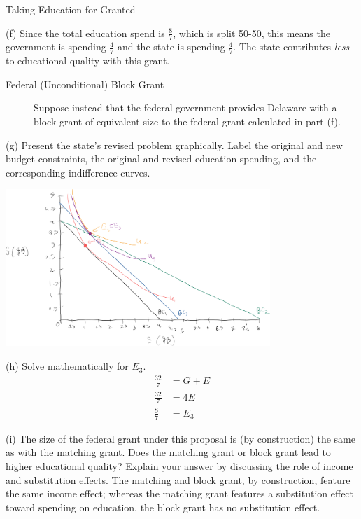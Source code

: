 \documentclass[8pt]{extarticle}
\begin{document}
\begin{problem}{Taking Education for Granted}
\begin{problem}{(f)}
      \tcblower
      Since the total education spend is $\frac{8}{7}$, which is split 50-50, this means the government is spending $\frac{4}{7}$ and the state is spending $\frac{4}{7}$. The state contributes \textit{less} to educational quality with this grant.
    \end{problem}
    \begin{description}
      \item[Federal (Unconditional) Block Grant] Suppose instead that the federal government provides Delaware with a block grant of equivalent size to the federal grant calculated in part (f).
    \end{description}
    \begin{problem}{(g)}
      Present the state's revised problem graphically. Label the original and new budget constraints, the original and revised education spending, and the corresponding indifference curves.
      \tcblower
      \begin{center}
        \includegraphics[width=0.75\textwidth]{images/3_4_g.png}
      \end{center}
    \end{problem}
    \begin{problem}{(h)}
      Solve mathematically for $E_3$.
      \tcblower
      \begin{align*}
        \frac{32}{7} &= G + E \\
      \frac{32}{7} &= 4E\\
      \frac{8}{7} &= E_3
      \end{align*}
    \end{problem}
    \begin{problem}{(i)}
      The size of the federal grant under this proposal is (by construction) the same as with the matching grant. Does the matching grant or block grant lead to higher educational quality? Explain your answer by discussing the role of income and substitution effects.
      \tcblower
      The matching and block grant, by construction, feature the same income effect; whereas the matching grant features a substitution effect toward spending on education, the block grant has no substitution effect.

\end{problem}
\end{problem}
\end{document}
